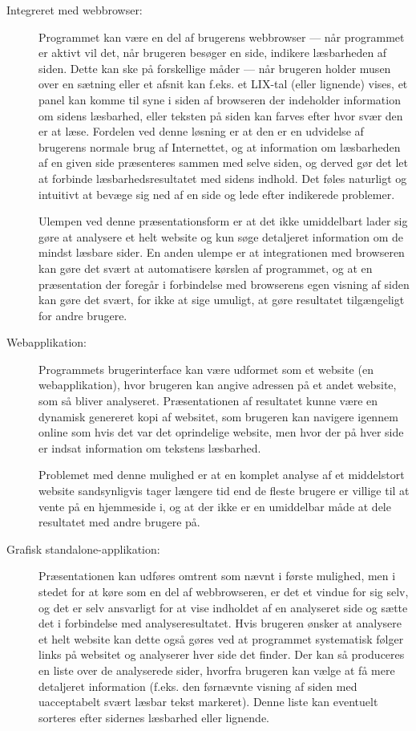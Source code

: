 \documentclass[a4paper,oneside,article]{memoir}
\begin{document}
\begin{description}
\item[Integreret med webbrowser:]
  Programmet kan være en del af brugerens webbrowser --- når
  programmet er aktivt vil det, når brugeren besøger en side, indikere
  læsbarheden af siden. Dette kan ske på forskellige måder --- når
  brugeren holder musen over en sætning eller et afsnit kan f.eks. et
  LIX-tal (eller lignende) vises, et panel kan komme til syne i siden
  af browseren der indeholder information om sidens læsbarhed, eller
  teksten på siden kan farves efter hvor svær den er at læse. Fordelen
  ved denne løsning er at den er en udvidelse af brugerens normale
  brug af Internettet, og at information om læsbarheden af en given
  side præsenteres sammen med selve siden, og derved gør det let at
  forbinde læsbarhedsresultatet med sidens indhold. Det føles
  naturligt og intuitivt at bevæge sig ned af en side og lede efter
  indikerede problemer. 

  Ulempen ved denne præsentationsform er at det ikke umiddelbart lader
  sig gøre at analysere et helt website og kun søge detaljeret
  information om de mindst læsbare sider. En anden ulempe er at
  integrationen med browseren kan gøre det svært at automatisere
  kørslen af programmet, og at en præsentation der foregår i
  forbindelse med browserens egen visning af siden kan gøre det svært,
  for ikke at sige umuligt, at gøre resultatet tilgængeligt for andre
  brugere.

\item[Webapplikation:]
  Programmets brugerinterface kan være udformet som et website (en
  webapplikation), hvor brugeren kan angive adressen på et andet
  website, som så bliver analyseret. Præsentationen af resultatet
  kunne være en dynamisk genereret kopi af websitet, som brugeren kan
  navigere igennem online som hvis det var det oprindelige website,
  men hvor der på hver side er indsat information om tekstens
  læsbarhed. 

  Problemet med denne mulighed er at en komplet analyse af et
  middelstort website sandsynligvis tager længere tid end de fleste
  brugere er villige til at vente på en hjemmeside i, og at der ikke
  er en umiddelbar måde at dele resultatet med andre brugere på.

\item[Grafisk standalone-applikation:] 
  Præsentationen kan udføres omtrent som nævnt i første mulighed, men
  i stedet for at køre som en del af webbrowseren, er det et vindue
  for sig selv, og det er selv ansvarligt for at vise indholdet af en
  analyseret side og sætte det i forbindelse med
  analyseresultatet. Hvis brugeren ønsker at analysere et helt website
  kan dette også gøres ved at programmet systematisk følger links på
  websitet og analyserer hver side det finder. Der kan så produceres
  en liste over de analyserede sider, hvorfra brugeren kan vælge at få
  mere detaljeret information (f.eks. den førnævnte visning af siden
  med uacceptabelt svært læsbar tekst markeret). Denne liste kan
  eventuelt sorteres efter sidernes læsbarhed eller lignende.


\end{description}
\end{document}
